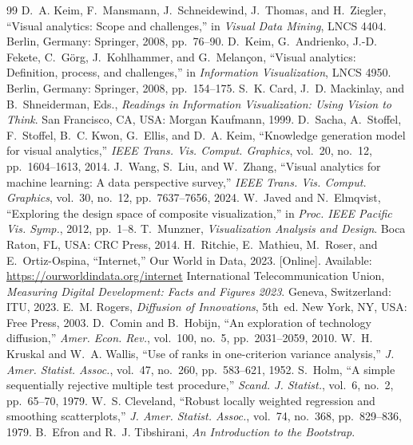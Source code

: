 \documentclass[conference,a4paper]{IEEEtran}
\begin{document}
\begin{thebibliography}{99}
 D.~A. Keim, F.~Mansmann, J.~Schneidewind, J.~Thomas, and H.~Ziegler,
``Visual analytics: Scope and challenges,'' in \emph{Visual Data Mining}, LNCS 4404. Berlin, Germany: Springer, 2008, pp.~76--90.
 D.~Keim, G.~Andrienko, J.-D. Fekete, C.~G\"org, J.~Kohlhammer, and
G.~Melan\c{c}on, ``Visual analytics: Definition, process, and challenges,'' in \emph{Information
Visualization}, LNCS 4950. Berlin, Germany: Springer, 2008, pp.~154--175.
 S.~K. Card, J.~D. Mackinlay, and B.~Shneiderman, Eds., \emph{Readings in
Information Visualization: Using Vision to Think}. San Francisco, CA, USA: Morgan Kaufmann, 1999.
 D.~Sacha, A.~Stoffel, F.~Stoffel, B.~C. Kwon, G.~Ellis, and D.~A. Keim,
``Knowledge generation model for visual analytics,'' \emph{IEEE Trans. Vis. Comput. Graphics},
vol.~20, no.~12, pp.~1604--1613, 2014.
 J.~Wang, S.~Liu, and W.~Zhang, ``Visual analytics for machine learning: A
data perspective survey,'' \emph{IEEE Trans. Vis. Comput. Graphics}, vol.~30, no.~12, pp.~7637--7656, 2024.
 W.~Javed and N.~Elmqvist, ``Exploring the design space of composite
visualization,'' in \emph{Proc. IEEE Pacific Vis. Symp.}, 2012, pp.~1--8.
 T.~Munzner, \emph{Visualization Analysis and Design}. Boca Raton, FL, USA: CRC Press, 2014.
 H.~Ritchie, E.~Mathieu, M.~Roser, and E.~Ortiz-Ospina, ``Internet,'' Our World in
Data, 2023. [Online]. Available: \url{https://ourworldindata.org/internet}
 International Telecommunication Union, \emph{Measuring Digital Development: Facts
and Figures 2023}. Geneva, Switzerland: ITU, 2023.
 E.~M. Rogers, \emph{Diffusion of Innovations}, 5th~ed. New York, NY, USA: Free Press, 2003.
 D.~Comin and B.~Hobijn, ``An exploration of technology diffusion,''
\emph{Amer. Econ. Rev.}, vol.~100, no.~5, pp.~2031--2059, 2010.
 W.~H. Kruskal and W.~A. Wallis, ``Use of ranks in one-criterion variance
analysis,'' \emph{J. Amer. Statist. Assoc.}, vol.~47, no.~260, pp.~583--621, 1952.
 S.~Holm, ``A simple sequentially rejective multiple test procedure,''
\emph{Scand. J. Statist.}, vol.~6, no.~2, pp.~65--70, 1979.
 W.~S. Cleveland, ``Robust locally weighted regression and smoothing
scatterplots,'' \emph{J. Amer. Statist. Assoc.}, vol.~74, no.~368, pp.~829--836, 1979.
 B.~Efron and R.~J. Tibshirani, \emph{An Introduction to the Bootstrap}.

\end{thebibliography}
\end{document}
